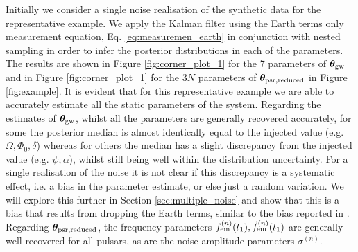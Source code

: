 \documentclass[fleqn,usenatbib,useAMS]{mnras}
\begin{document}
Initially we consider a single noise realisation of the synthetic data for the representative example. We apply the Kalman filter using the Earth terms only measurement equation, Eq. \ref{eq:measuremen_earth} in conjunction with nested sampling in order to infer the posterior distributions in each of the parameters. The results are shown in Figure \ref{fig:corner_plot_1} for the 7 parameters of  $\boldsymbol{\theta}_{\rm gw}$ and in Figure \ref{fig:corner_plot_1} for the 3$N$ parameters of $\boldsymbol{\theta}_{\rm psr, reduced}$ in Figure \ref{fig:example}. It is evident that for this representative example we are able to accurately estimate all the static parameters of the system. Regarding the estimates of $\boldsymbol{\theta}_{\rm gw}$, whilst all the parameters are generally recovered accurately, for some the posterior median is almost identically equal to the injected value  (e.g. $\Omega, \Phi_0, \delta$) whereas for others the median has a slight discrepancy from the  injected value (e.g. $\psi, \alpha$), whilst still being well within the distribution uncertainty. For a single realisation of the noise it is not clear if this discrepancy is a systematic effect, i.e. a bias in the parameter estimate, or else just a random variation. We will explore this further in Section \ref{sec:multiple_noise} and show that this is a bias that results from dropping the Earth terms, similar to the bias reported in \cite{Zhupulsarterms}. Regarding $\boldsymbol{\theta}_{\rm psr, reduced}$, the frequency parameters $f_{\rm em}^{(n)}(t_1),\dot{f}_{\rm em}^{(n)}(t_1)$ are generally well recovered for all pulsars, as are the noise amplitude parameters $\sigma^{(n)}$. 
\end{document}
